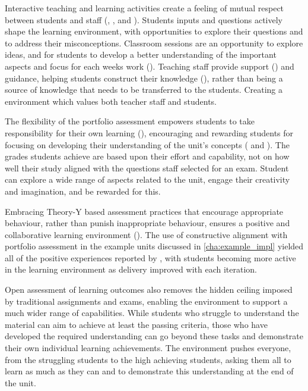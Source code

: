Interactive teaching and learning activities create a feeling of mutual respect between students and staff (, , and ). Students inputs and questions actively shape the learning environment, with opportunities to explore their questions and to address their misconceptions. Classroom sessions are an opportunity to explore ideas, and for students to develop a better understanding of the important aspects and focus for each weeks work (). Teaching staff provide support () and guidance, helping students construct their knowledge (), rather than being a source of knowledge that needs to be transferred to the students. Creating a environment which values both teacher staff and students. 

The flexibility of the portfolio assessment empowers students to take responsibility for their own learning (), encouraging and rewarding students for focusing on developing their understanding of the unit's concepts ( and ). The grades students achieve are based upon their effort and capability, not on how well their study aligned with the questions staff selected for an exam. Student can explore a wide range of aspects related to the unit, engage their creativity and imagination, and be rewarded for this. 

Embracing Theory-Y based assessment practices that encourage appropriate behaviour, rather than punish inappropriate behaviour, ensures a positive and collaborative learning environment (). The use of constructive alignment with portfolio assessment in the example units discussed in \cref{cha:example_impl} yielded all of the positive experiences reported by \citet{Markwell:2004}, with students becoming more active in the learning environment as delivery improved with each iteration.

Open assessment of learning outcomes also removes the hidden ceiling imposed by traditional assignments and exams, enabling the environment to support a much wider range of capabilities. While students who struggle to understand the material can aim to achieve at least the passing criteria, those who have developed the required understanding can go beyond these tasks and demonstrate their own individual learning achievements. The environment pushes everyone, from the struggling students to the high achieving students, asking them all to learn as much as they can and to demonstrate this understanding at the end of the unit. 

